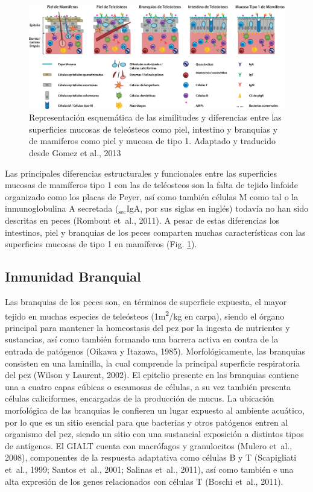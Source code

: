 \documentclass[12pt,letterpaper,oneside]{scrbook}
\begin{document}
\begin{figure}[h!]
    \centering
    \includegraphics[width=\textwidth]{mucosalimmunity} 
    \caption {Representación esquemática de las similitudes y diferencias entre las superficies mucosas de teleósteos como piel, intestino y branquias y de mamiferos como piel y mucosa de tipo 1. Adaptado y traducido desde Gomez et al., 2013}
    \label {fig:mucosal}
\end{figure}

Las principales diferencias estructurales y funcionales entre las
superficies mucosas de mamíferos tipo 1 con las de teléosteos son la
falta de tejido linfoide organizado como los placas de Peyer, así como
también células M como tal o la inmunoglobulina A secretada
(\(\mathrm{_{sec}}\)IgA, por sus siglas en inglés) todavía no han sido
descritas en peces (Rombout et~al., 2011). A pesar de estas diferencias
los intestinos, piel y branquias de los peces comparten muchas
características con las superficies mucosas de tipo 1 en mamíferos (Fig.
\ref{fig:mucosal}).

\subsection{Inmunidad Branquial}

Las branquias de los peces son, en términos de superficie expuesta, el
mayor tejido en muchas especies de teleósteos (1m\textsuperscript{2}/kg
en carpa), siendo el órgano principal para mantener la homeostasis del
pez por la ingesta de nutrientes y sustancias, así como también formando
una barrera activa en contra de la entrada de patógenos (Oikawa y
Itazawa, 1985). Morfológicamente, las branquias consisten en una
laminilla, la cual comprende la principal superficie respiratoria del
pez (Wilson y Laurent, 2002). El epitelio presente en las branquias
contiene una a cuatro capas cúbicas o escamosas de células, a su vez
también presenta células caliciformes, encargadas de la producción de
mucus. La ubicación morfológica de las branquias le confieren un lugar
expuesto al ambiente acuático, por lo que es un sitio esencial para que
bacterias y otros patógenos entren al organismo del pez, siendo un sitio
con una sustancial exposición a distintos tipos de antígenos. El GIALT
cuenta con macrófagos y granulocitos (Mulero et~al., 2008), componentes
de la respuesta adaptativa como células B y T (Scapigliati et~al., 1999;
Santos et~al., 2001; Salinas et~al., 2011), así como también e una alta
expresión de los genes relacionados con células T (Boschi et~al., 2011).
\end{document}
